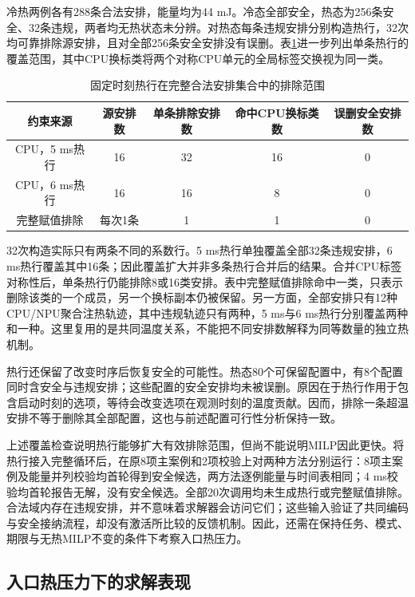 冷热两例各有288条合法安排，能量均为44 mJ。冷态全部安全，热态为256条安全、32条违规，两者均无热状态未分辨。对热态每条违规安排分别构造热行，32次均可靠排除源安排，且对全部256条安全安排没有误删。表\ref{tab:thermal-row-coverage}进一步列出单条热行的覆盖范围，其中CPU换标类将两个对称CPU单元的全局标签交换视为同一类。

\begin{table}[htbp]
\centering\small
\caption{固定时刻热行在完整合法安排集合中的排除范围}
\label{tab:thermal-row-coverage}
\setlength{\tabcolsep}{5pt}
\begin{tabular}{@{}ccccc@{}}
\toprule
约束来源 & 源安排数 & 单条排除安排数 & 命中CPU换标类数 & 误删安全安排数\\
\midrule
CPU，5 ms热行 & 16 & 32 & 16 & 0\\
CPU，6 ms热行 & 16 & 16 & 8 & 0\\
完整赋值排除 & 每次1条 & 1 & 1 & 0\\
\bottomrule
\end{tabular}
\end{table}

32次构造实际只有两条不同的系数行。5 ms热行单独覆盖全部32条违规安排，6 ms热行覆盖其中16条；因此覆盖扩大并非多条热行合并后的结果。合并CPU标签对称性后，单条热行仍能排除8或16类安排。表中完整赋值排除命中一类，只表示删除该类的一个成员，另一个换标副本仍被保留。另一方面，全部安排只有12种CPU/NPU聚合注热轨迹，其中违规轨迹只有两种，5 ms与6 ms热行分别覆盖两种和一种。这里复用的是共同温度关系，不能把不同安排数解释为同等数量的独立热机制。

热行还保留了改变时序后恢复安全的可能性。热态80个可保留配置中，有8个配置同时含安全与违规安排；这些配置的安全安排均未被误删。原因在于热行作用于包含启动时刻的选项，等待会改变选项在观测时刻的温度贡献。因而，排除一条超温安排不等于删除其全部配置，这也与前述配置可行性分析保持一致。

上述覆盖检查说明热行能够扩大有效排除范围，但尚不能说明MILP因此更快。将热行接入完整循环后，在原8项主案例和2项校验上对两种方法分别运行：8项主案例及能量并列校验均首轮得到安全候选，两方法逐例能量与时间表相同；4 ms校验均首轮报告无解，没有安全候选。全部20次调用均未生成热行或完整赋值排除。合法域内存在违规安排，并不意味着求解器会访问它们；这些输入验证了共同编码与安全接纳流程，却没有激活所比较的反馈机制。因此，还需在保持任务、模式、期限与无热MILP不变的条件下考察入口热压力。

\subsection{入口热压力下的求解表现}


